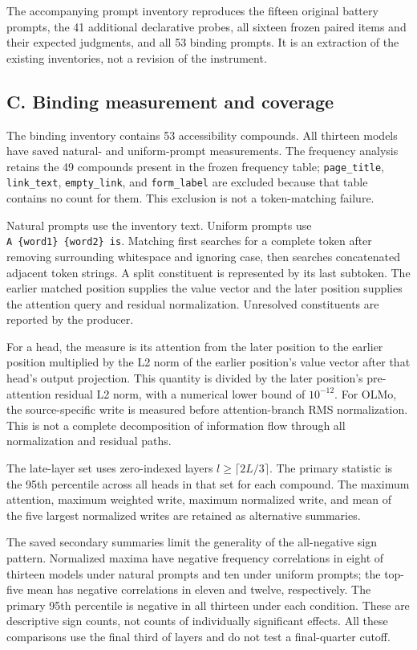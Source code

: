 \documentclass[
  english,
]{article}
\begin{document}
The accompanying prompt inventory reproduces the fifteen original battery prompts, the 41 additional declarative probes, all sixteen frozen paired items and their expected judgments, and all 53 binding prompts. It is an extraction of the existing inventories, not a revision of the instrument.

\subsection{C. Binding measurement and coverage}\label{c.-binding-measurement-and-coverage}

The binding inventory contains 53 accessibility compounds. All thirteen models have saved natural- and uniform-prompt measurements. The frequency analysis retains the 49 compounds present in the frozen frequency table; \texttt{page\_title}, \texttt{link\_text}, \texttt{empty\_link}, and \texttt{form\_label} are excluded because that table contains no count for them. This exclusion is not a token-matching failure.

Natural prompts use the inventory text. Uniform prompts use \texttt{A\ \{word1\}\ \{word2\}\ is}. Matching first searches for a complete token after removing surrounding whitespace and ignoring case, then searches concatenated adjacent token strings. A split constituent is represented by its last subtoken. The earlier matched position supplies the value vector and the later position supplies the attention query and residual normalization. Unresolved constituents are reported by the producer.

For a head, the measure is its attention from the later position to the earlier position multiplied by the L2 norm of the earlier position's value vector after that head's output projection. This quantity is divided by the later position's pre-attention residual L2 norm, with a numerical lower bound of \(10^{-12}\). For OLMo, the source-specific write is measured before attention-branch RMS normalization. This is not a complete decomposition of information flow through all normalization and residual paths.

The late-layer set uses zero-indexed layers \(l \geq \lceil 2L/3 \rceil\). The primary statistic is the 95th percentile across all heads in that set for each compound. The maximum attention, maximum weighted write, maximum normalized write, and mean of the five largest normalized writes are retained as alternative summaries.

The saved secondary summaries limit the generality of the all-negative sign pattern. Normalized maxima have negative frequency correlations in eight of thirteen models under natural prompts and ten under uniform prompts; the top-five mean has negative correlations in eleven and twelve, respectively. The primary 95th percentile is negative in all thirteen under each condition. These are descriptive sign counts, not counts of individually significant effects. All these comparisons use the final third of layers and do not test a final-quarter cutoff.
\end{document}
